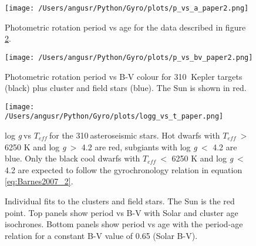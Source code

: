\documentclass[10pt,preprint]{aastex}
\newcommand{\logg}{log \emph{g}}
\newcommand{\teff}{$T_{eff}$}
\newcommand{\nastero}{310}
\begin{document}



\begin{figure}[ht]
\begin{center}
\texttt{[image: /Users/angusr/Python/Gyro/plots/p\_vs\_a\_paper2.png]}
\caption{Photometric rotation period vs age for the data described in figure \ref{fig:3d}.}
\label{fig:p_vs_a}
\end{center}
\end{figure}

\begin{figure}[ht]
\begin{center}
\texttt{[image: /Users/angusr/Python/Gyro/plots/p\_vs\_bv\_paper2.png]}
\caption{Photometric rotation period vs B-V colour for \nastero$~$ Kepler targets (black) plus cluster and field stars (blue). The Sun is shown in red.}
\label{fig:3d}
\end{center}
\end{figure}

\begin{figure}[ht]
\begin{center}
\texttt{[image: /Users/angusr/Python/Gyro/plots/logg\_vs\_t\_paper.png]}
\caption{\logg$~$vs \teff$~$for the \nastero$~$asteroseismic stars. Hot dwarfs with \teff$~>$ 6250 K and \logg$~>$ 4.2 are red, subgiants with \logg$~<$ 4.2 are blue. Only the black cool dwarfs with \teff$~<$ 6250 K and \logg$~<$ 4.2 are expected to follow the gyrochronology relation in equation \ref{eq:Barnes2007_2}.}
\label{fig:logg_vs_t}
\end{center}
\end{figure}

\begin{figure}[ht]
\begin{center}
    \end{center}
    \caption{ Individual fits to the clusters and field stars. The Sun is the red point. Top panels show period vs B-V with Solar and cluster age isochrones. Bottom panels show period vs age with the period-age relation for a constant B-V value of 0.65 (Solar B-V).}
   \label{fig:subfigures2}
\end{figure}
\end{document}
